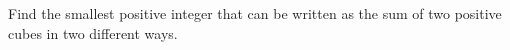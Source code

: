Find the smallest positive integer that can be written as the sum of two positive cubes in two different ways.
